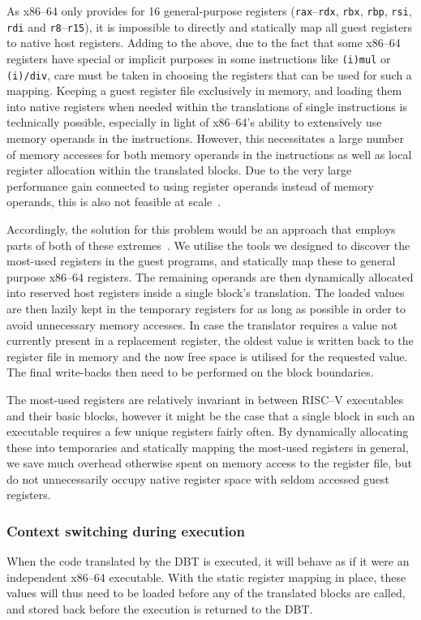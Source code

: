 As x86--64 only provides for 16 general-purpose registers (\texttt{rax}--\texttt{rdx}, \texttt{rbx}, \texttt{rbp}, \texttt{rsi}, \texttt{rdi} and \texttt{r8}--\texttt{r15}), it is impossible to directly and statically map all guest registers to native host registers.
Adding to the above, due to the fact that some x86--64 registers have special or implicit purposes in some instructions like \texttt{(i)mul} or \texttt{(i)/div}, care must be taken in choosing the registers that can be used for such a mapping.
Keeping a guest register file exclusively in memory, and loading them into native registers when needed within the translations of single instructions is technically possible, especially in light of x86--64's ability to extensively use memory operands in the instructions.
However, this necessitates a large number of memory accesses for both memory operands in the instructions as well as local register allocation within the translated blocks.
Due to the very large performance gain connected to using register operands instead of memory operands, this is also not feasible at scale~\cite[S. 8f.]{bintrans}.

Accordingly, the solution for this problem would be an approach that employs parts of both of these extremes~\cite[S. 9]{bintrans}.
We utilise the tools we designed to discover the most-used registers in the guest programs, and statically map these to general purpose x86--64 registers.
The remaining operands are then dynamically allocated into reserved host registers inside a single block's translation.
The loaded values are then lazily kept in the temporary registers for as long as possible in order to avoid unnecessary memory accesses.
In case the translator requires a value not currently present in a replacement register, the oldest value is written back to the register file in memory and the now free space is utilised for the requested value.
The final write-backs then need to be performed on the block boundaries.

The most-used registers are relatively invariant in between RISC--V executables and their basic blocks, however it might be the case that a single block in such an executable requires a few unique registers fairly often.
By dynamically allocating these into temporaries and statically mapping the most-used registers in general, we save much overhead otherwise spent on memory access to the register file, but do not unnecessarily occupy native register space with seldom accessed guest registers.

\subsubsection{Context switching during execution}
When the code translated by the DBT is executed, it will behave as if it were an independent x86--64 executable.
With the static register mapping in place, these values will thus need to be loaded before any of the translated blocks are called, and stored back before the execution is returned to the DBT\@.

